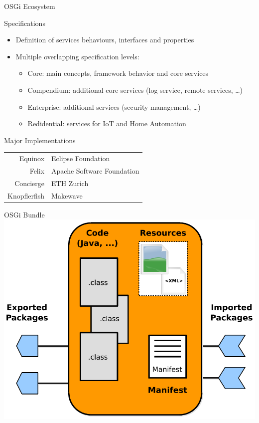 \begin{frame}{OSGi Ecosystem}
\begin{block}{Specifications}
\begin{itemize}
\item Definition of services behaviours, interfaces and properties
\item Multiple overlapping specification levels:
\begin{itemize}
\item Core: main concepts, framework behavior and core services
\item Compendium: additional core services (log service, remote services, \ldots)
\item Enterprise: additional services (security management, \ldots)
\item Redidential: services for IoT and Home Automation
\end{itemize}
\end{itemize}
\end{block}

\begin{block}{Major Implementations}
\begin{center}
\begin{tabular}{rl}
Equinox & Eclipse Foundation\\
Felix & Apache Software Foundation\\
Concierge & ETH Zurich\\
Knopflerfish & Makewave\\
\end{tabular}
\end{center}
\end{block}
\end{frame}

\begin{frame}{OSGi Bundle}
\centering
\includegraphics[height=.8\textheight]{../imgs/bundle}
\end{frame}

